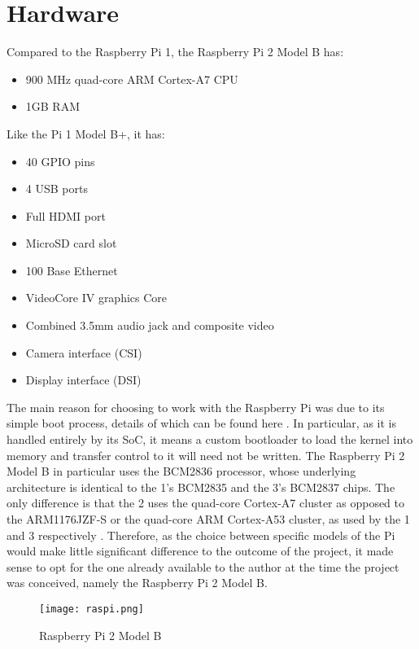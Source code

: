 \documentclass[10pt,a4paper]{article}
\begin{document}
\section*{Hardware}
Compared to the Raspberry Pi 1, the Raspberry Pi 2 Model B has:
\begin{itemize}
    \itemsep0em
    \item 900 MHz quad-core ARM Cortex-A7 CPU
    \item 1GB RAM
\end{itemize}
Like the Pi 1 Model B+, it has:
\begin{itemize}
    \itemsep0em
    \item 40 GPIO pins
    \item 4 USB ports
    \item Full HDMI port
    \item MicroSD card slot
    \item 100 Base Ethernet
    \item VideoCore IV graphics Core
    \item Combined 3.5mm audio jack and composite video
    \item Camera interface (CSI)
    \item Display interface (DSI)
\end{itemize}

The main reason for choosing to work with the Raspberry Pi was due to its simple
boot process, details of which can be found here \cite{pi_boot}. In particular,
as it is handled entirely by its SoC, it means a custom bootloader to load the
kernel into memory and transfer control to it will need not be written. The
Raspberry Pi 2 Model B in particular uses the BCM2836 processor, whose
underlying architecture is identical to the 1's BCM2835 and the 3's BCM2837
chips. The only difference is that the 2 uses the quad-core Cortex-A7 cluster as
opposed to the ARM1176JZF-S or the quad-core ARM Cortex-A53 cluster, as used by
the 1 and 3 respectively \cite{BCM2835,BCM2837}.  Therefore, as the choice
between specific models of the Pi would make little significant difference to
the outcome of the project, it made sense to opt for the one already available
to the author at the time the project was conceived, namely the Raspberry Pi 2
Model B.

\begin{figure}[h]
    \begin{center}
        \texttt{[image: raspi.png]}
        \caption{Raspberry Pi 2 Model B \cite{Pi}}
    \end{center}
\end{figure}
\end{document}

